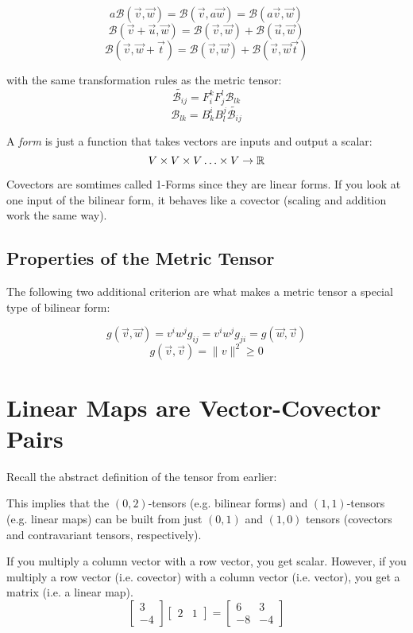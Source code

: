 \documentclass{report}
\begin{document}
$$ a \mathcal{B} \left( \vec{v}, \vec{w} \right) = \mathcal{B}\left( \vec{v}, a \vec{w} \right) = \mathcal{B}\left( a \vec{v}, \vec{w} \right)$$ 
$$ \mathcal{B}\left( \vec{v}+\vec{u}, \vec{w} \right) = \mathcal{B}\left( \vec{v}, \vec{w} \right) + \mathcal{B}\left( \vec{u}, \vec{w} \right) $$ 
$$ \mathcal{B}\left( \vec{v}, \vec{w} + \vec{t} \right) = \mathcal{B}\left( \vec{v}, \vec{w} \right) + \mathcal{B}\left( \vec{v}, \vec{w} \vec{t} \right) $$ 

with the same transformation rules as the metric tensor:
$$ \widetilde{\mathcal{B}_{ij}} = F_i^k F_j^l \mathcal{B}_{lk} $$ 
$$ \mathcal{B}_{lk} = B_k^i B_l^j \widetilde{\mathcal{B}_{ij}} $$ 

A \emph{form} is just a function that takes vectors are inputs and output a scalar:
$$ V \times V \times V \ldots \times V \to \R $$ 

Covectors are somtimes called 1-Forms since they are linear forms. If you look at one input of the bilinear form, it behaves like a covector (scaling and addition work the same way).

\section{Properties of the Metric Tensor}
The following two additional criterion are what makes a metric tensor a special type of bilinear form:

$$ g\left( \vec{v}, \vec{w} \right) = v^i w^j g_{ij} = v^i w^j g_{ji}= g\left( \vec{w}, \vec{v} \right) $$ 
$$ g\left(\vec{v}, \vec{v}\right) = \|v\|^2 \ge 0 $$ 

\chapter{Linear Maps are Vector-Covector Pairs}
Recall the abstract definition of the tensor from earlier:


This implies that the $(0, 2)$-tensors (e.g. bilinear forms) and $(1, 1)$-tensors (e.g. linear maps) can be built from just $(0, 1)$ and $(1, 0)$ tensors (covectors and contravariant tensors, respectively).

If you multiply a column vector with a row vector, you get scalar. However, if you multiply a row vector (i.e. covector) with a column vector (i.e. vector), you get a matrix (i.e. a linear map).
$$ \begin{bmatrix} 3 \\ -4 \end{bmatrix} \begin{bmatrix} 2 & 1 \end{bmatrix}  = \begin{bmatrix} 6 & 3 \\ -8 & -4 \end{bmatrix}  $$ 
\end{document}
